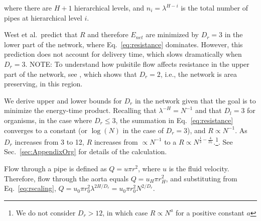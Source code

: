 \documentclass[12pt]{article}
\begin{document}
\noindent where there are $H+1$ hierarchical levels, and $n_i = \lambda^{H-i}$
is the total number of pipes at hierarchical level $i$.  

West et al.\ predict that $R$ and therefore $E_{net}$ are minimized by $D_r =
3$ in the lower part of the network,  where Eq.~\ref{eq:resistance} dominates.
However, this prediction does not account for delivery time, which slows
dramatically when $D_r = 3$.  NOTE: To understand how pulsitile flow affects
resistance in the upper part of the network, see \cite{west97}, which shows
that $D_r = 2$, i.e., the network is area preserving, in this region.

We derive upper and lower bounds for $D_r$ in the network given that the goal
is to minimize the energy-time product.  Recalling that $\lambda^{-H} = N^{-1}$
and that $D_l = 3$ for organisms, in the case where $D_r \leq 3$, the summation
in Eq.~\ref{eq:resistance} converges to a constant (or $\log(N)$ in the case of
$D_r=3$), and $R \propto N^{-1}$. As $D_r$ increases from 3 to 12, $R$
increases from $\propto N^{-1}$ to a $R \propto N^{\frac{1}{3} -
\frac{4}{D_r}}$.\footnote{We do not consider $D_r > 12$, in which case $R
\propto N^a$ for a positive constant $a$}. See Sec.~\ref{sec:AppendixOrg} for
details of the calculation.


Flow through a pipe is defined as $Q = u\pi r^2$, where $u$ is the fluid 
velocity. 
Therefore, flow through the aorta equals
$Q = u_H \pi r_{H}^2$, and substituting from Eq.~\ref{eq:rscaling}, $Q = u_0 \pi r_0^2
\lambda^{2H/D_r} = u_0 \pi r_0^2N^{2/D_r} $. 
\end{document}

